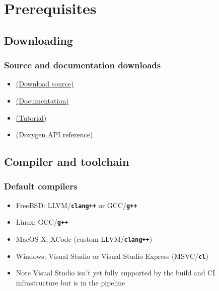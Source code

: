 \documentclass{beamer}
\newcommand{\cmd}[1]{\textbf{\texttt{#1}}}
\begin{document}
\section{Prerequisites}

\subsection{Downloading}

\begin{frame}
  \frametitle{Source and documentation downloads}
  \begin{itemize}
  \item \href{http://downloads.openmicroscopy.org/bio-formats-cpp/}{(Download source)}
  \item \href{http://www.openmicroscopy.org/site/support/bio-formats5.1/developers/index.html\#using-bio-formats-as-a-native-c-library}{(Documentation)}
  \item \href{http://www.openmicroscopy.org/site/support/bio-formats5.1/developers/cpp/tutorial.html}{(Tutorial)}
  \item \href{http://downloads.openmicroscopy.org/bio-formats-cpp/5.1.1/api/namespaces.html}{(Doxygen API reference)}
  \end{itemize}
\end{frame}

\subsection{Compiler and toolchain}

\begin{frame}
  \frametitle{Default compilers}
  \begin{itemize}
  \item FreeBSD: LLVM/\cmd{clang++} or GCC/\cmd{g++}
  \item Linux: GCC/\cmd{g++}
  \item MacOS X: XCode (custom LLVM/\cmd{clang++})
  \item Windows: Visual Studio or Visual Studio Express (MSVC/\cmd{cl})
    \pause
  \item Note Visual Studio isn't yet fully supported by the build and CI
    infrastructure but is in the pipeline
  \end{itemize}
\end{frame}
\end{document}
